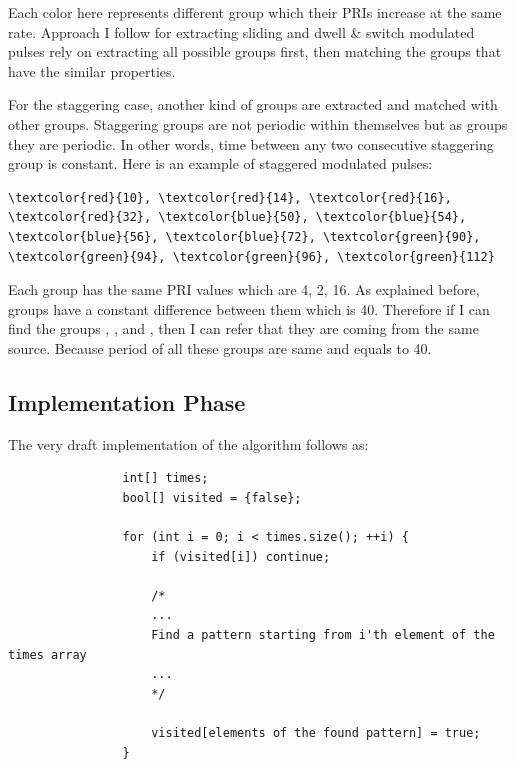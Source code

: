 \documentclass[12pt]{report}
\begin{document}
            Each color here represents different group which their PRIs increase at the same rate. Approach I follow for extracting sliding and dwell \& switch modulated pulses rely on extracting all possible groups first,
            then matching the groups that have the similar properties. \newline

            For the staggering case, another kind of groups are extracted and matched with other groups. Staggering groups are not periodic within themselves but as groups they are periodic. In other words, time between any two consecutive 
            staggering group is constant. Here is an example of staggered modulated pulses:

            \begin{Verbatim}[commandchars=\\\{\}]
                \textcolor{red}{10}, \textcolor{red}{14}, \textcolor{red}{16}, \textcolor{red}{32}, \textcolor{blue}{50}, \textcolor{blue}{54}, \textcolor{blue}{56}, \textcolor{blue}{72}, \textcolor{green}{90}, \textcolor{green}{94}, \textcolor{green}{96}, \textcolor{green}{112} 
            \end{Verbatim}
            \bigskip

            Each group has the same PRI values which are 4, 2, 16. As explained before, groups have a constant difference between them which is 40. Therefore if I can find the groups \codeword{[10, 50, 90]}, \codeword{[14, 54, 94]}, \codeword{[16, 56, 96]} and \codeword{[32, 72, 112]}, then I can refer that
            they are coming from the same source. Because period of all these groups are same and equals to 40.

            \pagebreak
        \subsection{Implementation Phase}
            The very draft implementation of the algorithm follows as:
            \begin{verbatim}
                int[] times;
                bool[] visited = {false};

                for (int i = 0; i < times.size(); ++i) {
                    if (visited[i]) continue;

                    /* 
                    ...
                    Find a pattern starting from i'th element of the times array
                    ...
                    */

                    visited[elements of the found pattern] = true;
                }
                
            \end{verbatim}
            
\end{document}
